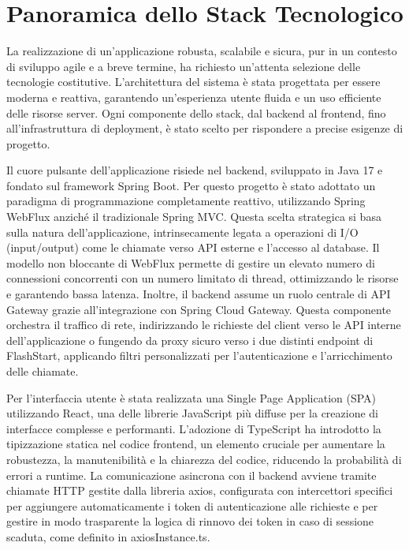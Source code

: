 \documentclass[12pt,a4paper,openright,twoside]{book}
\begin{document}
\section{Panoramica dello Stack Tecnologico}
\label{sec:stack_tecnologico}

La realizzazione di un'applicazione robusta, scalabile e sicura, pur in un contesto di sviluppo agile e a breve termine, ha richiesto un'attenta selezione delle tecnologie costitutive. L'architettura del sistema è stata progettata per essere moderna e reattiva, garantendo un'esperienza utente fluida e un uso efficiente delle risorse server. Ogni componente dello stack, dal backend al frontend, fino all'infrastruttura di deployment, è stato scelto per rispondere a precise esigenze di progetto.

Il cuore pulsante dell'applicazione risiede nel backend, sviluppato in Java 17 e fondato sul framework Spring Boot. Per questo progetto è stato adottato un paradigma di programmazione completamente reattivo, utilizzando Spring WebFlux anziché il tradizionale Spring MVC. Questa scelta strategica si basa sulla natura dell'applicazione, intrinsecamente legata a operazioni di I/O (input/output) come le chiamate verso API esterne e l'accesso al database. Il modello non bloccante di WebFlux permette di gestire un elevato numero di connessioni concorrenti con un numero limitato di thread, ottimizzando le risorse e garantendo bassa latenza. Inoltre, il backend assume un ruolo centrale di API Gateway grazie all'integrazione con Spring Cloud Gateway. Questa componente orchestra il traffico di rete, indirizzando le richieste del client verso le API interne dell'applicazione o fungendo da proxy sicuro verso i due distinti endpoint di FlashStart, applicando filtri personalizzati per l'autenticazione e l'arricchimento delle chiamate.

Per l'interfaccia utente è stata realizzata una Single Page Application (SPA) utilizzando React, una delle librerie JavaScript più diffuse per la creazione di interfacce complesse e performanti. L'adozione di TypeScript ha introdotto la tipizzazione statica nel codice frontend, un elemento cruciale per aumentare la robustezza, la manutenibilità e la chiarezza del codice, riducendo la probabilità di errori a runtime. La comunicazione asincrona con il backend avviene tramite chiamate HTTP gestite dalla libreria axios, configurata con intercettori specifici per aggiungere automaticamente i token di autenticazione alle richieste e per gestire in modo trasparente la logica di rinnovo dei token in caso di sessione scaduta, come definito in axiosInstance.ts.
\end{document}
